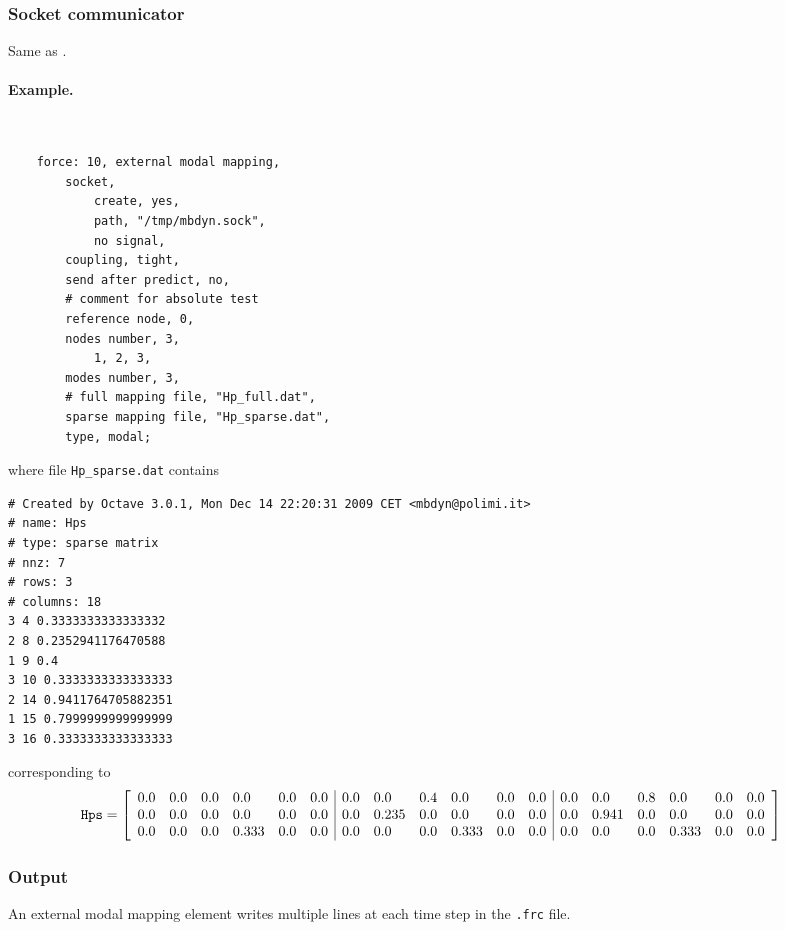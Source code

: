 \subsubsection{Socket communicator}
Same as .

\paragraph{Example.} \
\begin{verbatim}
    force: 10, external modal mapping,
        socket,
            create, yes,
            path, "/tmp/mbdyn.sock",
            no signal,
        coupling, tight,
        send after predict, no,
        # comment for absolute test
        reference node, 0,
        nodes number, 3,
            1, 2, 3,
        modes number, 3,
        # full mapping file, "Hp_full.dat",
        sparse mapping file, "Hp_sparse.dat",
        type, modal;
\end{verbatim}
where file \texttt{Hp\_sparse.dat} contains
\begin{verbatim}
# Created by Octave 3.0.1, Mon Dec 14 22:20:31 2009 CET <mbdyn@polimi.it>
# name: Hps
# type: sparse matrix
# nnz: 7
# rows: 3
# columns: 18
3 4 0.3333333333333332
2 8 0.2352941176470588
1 9 0.4
3 10 0.3333333333333333
2 14 0.9411764705882351
1 15 0.7999999999999999
3 16 0.3333333333333333
\end{verbatim}
corresponding to
{\small
\begin{align*}
	\texttt{Hps}
	&=
	\sqbr{\matr{llllll|llllll|llllll}{
		0.0 & 0.0 & 0.0 & 0.0   & 0.0 & 0.0 & 0.0 & 0.0   & 0.4 & 0.0   & 0.0 & 0.0 & 0.0 & 0.0   & 0.8 & 0.0   & 0.0 & 0.0
		\\
		0.0 & 0.0 & 0.0 & 0.0   & 0.0 & 0.0 & 0.0 & 0.235 & 0.0 & 0.0   & 0.0 & 0.0 & 0.0 & 0.941 & 0.0 & 0.0   & 0.0 & 0.0
		\\
		0.0 & 0.0 & 0.0 & 0.333 & 0.0 & 0.0 & 0.0 & 0.0   & 0.0 & 0.333 & 0.0 & 0.0 & 0.0 & 0.0   & 0.0 & 0.333 & 0.0 & 0.0
	}}
\end{align*}
}


\subsubsection{Output}
An external modal mapping element writes multiple lines at each time step
in the \texttt{.frc} file.

